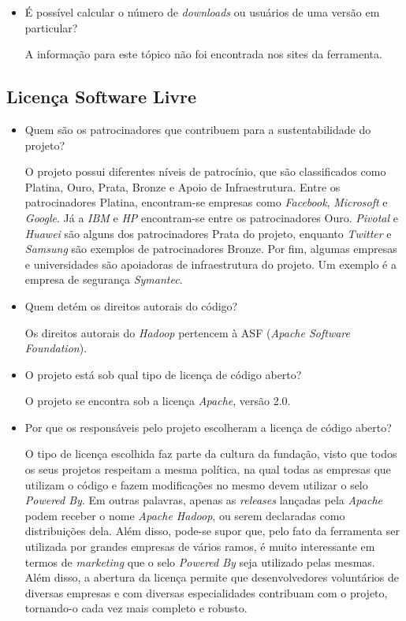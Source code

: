 \documentclass[12pt,a4paper]{article} %
\begin{document}
\begin{itemize}
\item É possível calcular o número de \textit{downloads} ou usuários de uma versão em particular?

A informação para este tópico não foi encontrada nos sites da ferramenta.
\end{itemize}

\subsection{Licença Software Livre}


\begin{itemize}
\item Quem são os patrocinadores que contribuem para a sustentabilidade do projeto?

O projeto possui diferentes níveis de patrocínio, que são classificados como Platina, Ouro, Prata, Bronze e Apoio de Infraestrutura. Entre os patrocinadores Platina, encontram-se empresas como \emph{Facebook}, \emph{Microsoft} e \emph{Google}. Já a \emph{IBM} e \emph{HP} encontram-se entre os patrocinadores Ouro. \emph{Pivotal} e \emph{Huawei} são alguns dos patrocinadores Prata do projeto, enquanto \emph{Twitter} e \emph{Samsung} são exemplos de patrocinadores Bronze. Por fim, algumas empresas e universidades são apoiadoras de infraestrutura do projeto. Um exemplo é a empresa de segurança \emph{Symantec}.

\item Quem detém os direitos autorais do código?

Os direitos autorais do \emph{Hadoop} pertencem à ASF (\emph{Apache Software Foundation}).

\item O projeto está sob qual tipo de licença de código aberto?

O projeto se encontra sob a licença \emph{Apache}, versão 2.0.

\item Por que os responsáveis pelo projeto escolheram a licença de código aberto?

O tipo de licença escolhida faz parte da cultura da fundação, visto que todos os seus projetos respeitam a mesma política, na qual todas as empresas que utilizam o código e fazem modificações no mesmo devem utilizar o selo \emph{Powered By}. Em outras palavras, apenas as \emph{releases} lançadas pela \emph{Apache} podem receber o nome \emph{Apache Hadoop}, ou serem declaradas como distribuições dela. Além disso, pode-se supor que, pelo fato da ferramenta ser utilizada por grandes empresas de vários ramos, é muito interessante em termos de \emph{marketing} que o selo \emph{Powered By} seja utilizado pelas mesmas. Além disso, a abertura da licença permite que desenvolvedores voluntários de diversas empresas e com diversas especialidades contribuam com o projeto, tornando-o cada vez mais completo e robusto.
\end{itemize}
\end{document}
